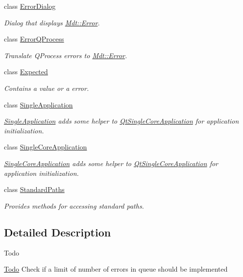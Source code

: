 \begin{DoxyCompactItemize}
class \hyperlink{class_mdt_1_1_error_dialog}{Error\+Dialog}
\begin{DoxyCompactList}\small\item\em Dialog that displays \hyperlink{class_mdt_1_1_error}{Mdt\+::\+Error}. \end{DoxyCompactList}\item 
class \hyperlink{class_mdt_1_1_error_q_process}{Error\+Q\+Process}
\begin{DoxyCompactList}\small\item\em Translate Q\+Process errors to \hyperlink{class_mdt_1_1_error}{Mdt\+::\+Error}. \end{DoxyCompactList}\item 
class \hyperlink{class_mdt_1_1_expected}{Expected}
\begin{DoxyCompactList}\small\item\em Contains a value or a error. \end{DoxyCompactList}\item 
class \hyperlink{class_mdt_1_1_single_application}{Single\+Application}
\begin{DoxyCompactList}\small\item\em \hyperlink{class_mdt_1_1_single_application}{Single\+Application} adds some helper to \hyperlink{class_qt_single_core_application}{Qt\+Single\+Core\+Application} for application initialization. \end{DoxyCompactList}\item 
class \hyperlink{class_mdt_1_1_single_core_application}{Single\+Core\+Application}
\begin{DoxyCompactList}\small\item\em \hyperlink{class_mdt_1_1_single_core_application}{Single\+Core\+Application} adds some helper to \hyperlink{class_qt_single_core_application}{Qt\+Single\+Core\+Application} for application initialization. \end{DoxyCompactList}\item 
class \hyperlink{class_mdt_1_1_standard_paths}{Standard\+Paths}
\begin{DoxyCompactList}\small\item\em Provides methods for accessing standard paths. \end{DoxyCompactList}\end{DoxyCompactItemize}


\subsection{Detailed Description}
\begin{DoxyRefDesc}{Todo}
\item[\hyperlink{todo__todo000006}{Todo}]Check if a limit of number of errors in queue should be implemented \end{DoxyRefDesc}
